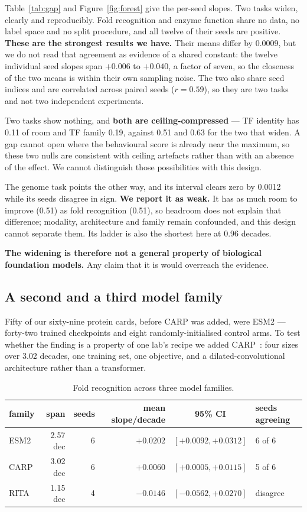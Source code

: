 \documentclass[11pt]{article}
\begin{document}
Table~\ref{tab:gap} and Figure~\ref{fig:forest} give the per-seed slopes.
Two tasks widen, clearly and reproducibly. Fold recognition and enzyme function
share no data, no label space and no split procedure, and all twelve of their
seeds are positive. \textbf{These are the strongest results we have.} Their means
differ by 0.0009, but we do not read that agreement as evidence of a shared
constant: the twelve individual seed slopes span $+0.006$ to $+0.040$, a factor of
seven, so the closeness of the two means is within their own sampling noise. The
two also share seed indices and are correlated across paired seeds ($r = 0.59$),
so they are two tasks and not two independent experiments.

Two tasks show nothing, and \textbf{both are ceiling-compressed} --- TF identity
has 0.11 of room and TF family 0.19, against 0.51 and 0.63 for the two that
widen. A gap cannot open where the behavioural score is already near the maximum,
so these two nulls are consistent with ceiling artefacts rather than with an
absence of the effect. We cannot distinguish those possibilities with this design.

The genome task points the other way, and its interval clears zero by 0.0012
while its seeds disagree in sign. \textbf{We report it as weak.} It has as much
room to improve (0.51) as fold recognition (0.51), so headroom does not explain
that difference; modality, architecture and family remain confounded, and this
design cannot separate them. Its ladder is also the shortest here at 0.96 decades.

\textbf{The widening is therefore not a general property of biological foundation
models.} Any claim that it is would overreach the evidence.

\subsection{A second and a third model family}

Fifty of our sixty-nine protein cards, before CARP was added, were ESM2 ---
forty-two trained checkpoints and eight randomly-initialised control arms. To test
whether the finding is a property of one lab's recipe we added
CARP~\citep{yang2024carp}: four sizes over 3.02 decades, one training set, one
objective, and a dilated-convolutional architecture rather than a transformer.

\begin{table}[h]
\centering
\small
\begin{tabular}{@{}lrrrcl@{}}
\toprule
\textbf{family} & \textbf{span} & \textbf{seeds} & \textbf{mean slope/decade} &
\textbf{95\% CI} & \textbf{seeds agreeing} \\
\midrule
ESM2 & 2.57 dec & 6 & $+0.0202$ & $[+0.0092, +0.0312]$ & 6 of 6 \\
CARP & 3.02 dec & 6 & $+0.0060$ & $[+0.0005, +0.0115]$ & 5 of 6 \\
RITA & 1.15 dec & 4 & $-0.0146$ & $[-0.0562, +0.0270]$ & disagree \\
\bottomrule
\end{tabular}
\caption{Fold recognition across three model families.}
\label{tab:families}
\end{table}
\end{document}
